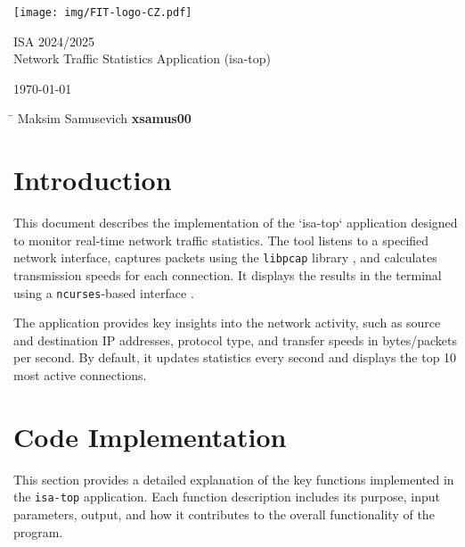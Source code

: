 \documentclass[12pt]{extarticle}
\begin{document}
\begin{titlepage}
\begin{center}
   \texttt{[image: img/FIT-logo-CZ.pdf]}

    {\Huge ISA 2024/2025} \\ \vspace{1em}
    {\LARGE Network Traffic Statistics Application (isa-top)} \\
\end{center}
 {\Large \today}
 \hfill
 \begin{minipage}[t]{3\textwidth}
   \begin{tabbing}
   \hspace*{5.5cm}\=\hspace*{2cm} \kill
    \Large{Maksim Samusevich} \> \Large{\textbf{xsamus00}}\\
   \end{tabbing}
 \end{minipage}
\end{titlepage}

\tableofcontents
\newpage
\listoffigures

\newpage

\section{Introduction}

This document describes the implementation of the `isa-top` application designed to monitor real-time network traffic statistics. The tool listens to a specified network interface, captures packets using the \texttt{libpcap} library \cite{libpcap}, and calculates transmission speeds for each connection. It displays the results in the terminal using a \texttt{ncurses}-based interface \cite{ncurses}.

The application provides key insights into the network activity, such as source and destination IP addresses, protocol type, and transfer speeds in bytes/packets per second. By default, it updates statistics every second and displays the top 10 most active connections.

\section{Code Implementation}

This section provides a detailed explanation of the key functions implemented in the \texttt{isa-top} application. Each function description includes its purpose, input parameters, output, and how it contributes to the overall functionality of the program.
\end{document}

